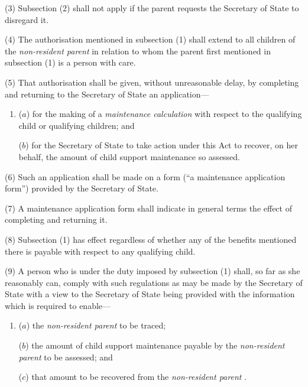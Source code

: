\documentclass[12pt,a4paper]{article}
\begin{document}
(3) Subsection (2)  shall not apply if the parent requests the Secretary of State to disregard it.

(4) The authorisation mentioned in subsection (1)  shall extend to all children of the 
\emph{non-resident parent}  %
in relation to whom the parent first mentioned in subsection (1)  is a person with care.

(5) That authorisation shall be given, without unreasonable delay, by completing and returning to the Secretary of State an application—
\begin{enumerate}\item[]
($a$) for the making of a 
\emph{maintenance calculation}  %
with respect to the qualifying child or qualifying children; and

($b$) for the Secretary of State to take action under this Act to recover, on her behalf, the amount of child support maintenance so assessed.
\end{enumerate}

(6) Such an application shall be made on a form (“a maintenance application form”) provided by the Secretary of State.

(7) A maintenance application form shall indicate in general terms the effect of completing and returning it.

(8) Subsection (1)  has effect regardless of whether any of the benefits mentioned there is payable with respect to any qualifying child.

(9) A person who is under the duty imposed by subsection (1)  shall, so far as she reasonably can, comply with such regulations as may be made by the Secretary of State with a view to the Secretary of State 
being provided with the information which is required to enable—
\begin{enumerate}\item[]
($a$) the 
\emph{non-resident parent}  %
to be traced;

($b$) the amount of child support maintenance payable by the 
\emph{non-resident parent}  %
to be assessed; and

($c$) that amount to be recovered from the 
\emph{non-resident parent}%
.
\end{enumerate}
\end{document}
